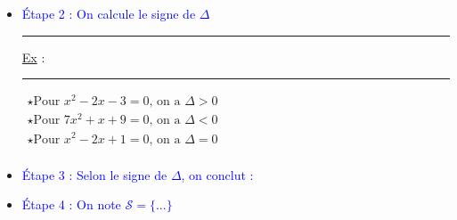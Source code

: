 \begin{itemize}[label=]
\bigskip 

\item  \textcolor{blue}{Étape 2 : On calcule le signe de $\Delta$}

\parbox[t]{1cm}{\hrule height 0pt width 0pt \underline {Ex} :} 
%
\parbox[t]{10cm}{\hrule height 0pt width 0pt $\begin{array}{l}
\star \text{Pour } x^2 -2x -3 = 0 \text{, on a } \Delta > 0\\
\star \text{Pour } 7x^2 +x +9 = 0\text{, on a } \Delta < 0\\
\star \text{Pour } x^2 -2x +1 = 0 \text{, on a } \Delta = 0\\       
\end{array} $}


\bigskip 

\item  \textcolor{blue}{Étape 3 : Selon le signe de $\Delta$, on conclut : }


\item  \textcolor{blue}{Étape 4  : On note $\mathcal{S}=\lbrace ...  \rbrace $} 
\end{itemize}






\ifdefined\COMPLETE
\else
    
\fi

